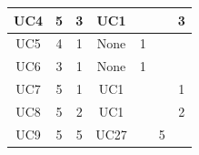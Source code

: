 \documentclass[12pt]{article}
\begin{document}
\begin{longtable}{|c|ccc|l|l|l|}
		UC4                  & \multicolumn{1}{c|}{5}               & \multicolumn{1}{c|}{3}                                                                         & UC1                &                                                                                            &                                                                                               & \multicolumn{1}{c|}{3}                                                                     \\ \hline
		UC5                  & \multicolumn{1}{c|}{4}               & \multicolumn{1}{c|}{1}                                                                         & None               & \multicolumn{1}{c|}{1}                                                                     &                                                                                               &                                                                                            \\ \hline
		UC6                  & \multicolumn{1}{c|}{3}               & \multicolumn{1}{c|}{1}                                                                         & None               & \multicolumn{1}{c|}{1}                                                                     &                                                                                               &                                                                                            \\ \hline
		UC7                  & \multicolumn{1}{c|}{5}               & \multicolumn{1}{c|}{1}                                                                         & UC1                &                                                                                            &                                                                                               & \multicolumn{1}{c|}{1}                                                                     \\ \hline
		UC8                  & \multicolumn{1}{c|}{5}               & \multicolumn{1}{c|}{2}                                                                         & UC1                &                                                                                            &                                                                                               & \multicolumn{1}{c|}{2}                                                                     \\ \hline
		UC9                  & \multicolumn{1}{c|}{5}               & \multicolumn{1}{c|}{5}                                                                         & UC27               &                                                                                            & \multicolumn{1}{c|}{5}                                                                        &                                                                                            \\ \hline

\end{longtable}
\end{document}
